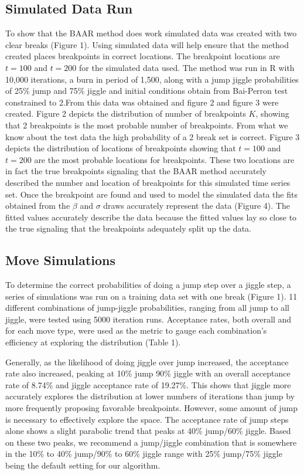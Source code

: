 \documentclass[submit]{smj}
\begin{document}
\subsection{Simulated Data Run}
To show that the BAAR method does work simulated data was created with two clear breaks (Figure 1). Using simulated data will help ensure that the method created places breakpoints in correct locations. The breakpoint locations are $t =100$ and $t=200$ for the simulated data used. The method was run in R with 10,000 iterations, a burn in period of 1,500, along with a jump jiggle probabilities of 25\% jump and 75\% jiggle and initial conditions obtain from Bai-Perron test constrained to 2.From this data was obtained and figure 2 and figure 3 were created. Figure 2 depicts the distribution of number of breakpoints $K$, showing that 2 breakpoints is the most probable number of breakpoints. From what we know about the test data the high probability of a 2 break set is correct. Figure 3 depicts the distribution of locations of breakpoints showing that $t=100$ and $t=200$ are the most probable locations for breakpoints. These two locations are in fact the true breakpoints signaling that the BAAR method accurately described the number and location of breakpoints for this simulated time series set. Once the breakpoint are found and used to model the simulated data the fits obtained from the $\beta$ and $\sigma$ draws accurately represent the data (Figure 4). The fitted values accurately describe the data because the fitted values lay so close to the true signaling that the breakpoints adequately split up the data.    

\subsection{Move Simulations}
To determine the correct probabilities of doing a jump step over a jiggle step, a series of simulations was run on a training data set with one break (Figure 1). 11 different combinations of jump-jiggle probabilities, ranging from all jump to all jiggle, were tested using 5000 iteration runs. Acceptance rates, both overall and for each move type, were used as the metric to gauge each combination's efficiency at exploring the distribution (Table 1).

Generally, as the likelihood of doing jiggle over jump increased, the acceptance rate also increased, peaking at 10\% jump 90\% jiggle with an overall acceptance rate of 8.74\% and jiggle acceptance rate of 19.27\%. This shows that jiggle more accurately explores the distribution at lower numbers of iterations than jump by more frequently proposing favorable breakpoints. However, some amount of jump is necessary to effectively explore the space. The acceptance rate of jump steps alone shows a slight parabolic trend that peaks at 40\% jump/60\% jiggle. Based on these two peaks, we recommend a jump/jiggle combination that is somewhere in the 10\% to 40\% jump/90\% to 60\% jiggle range with 25\% jump/75\% jiggle being the default setting for our algorithm.
\end{document}
